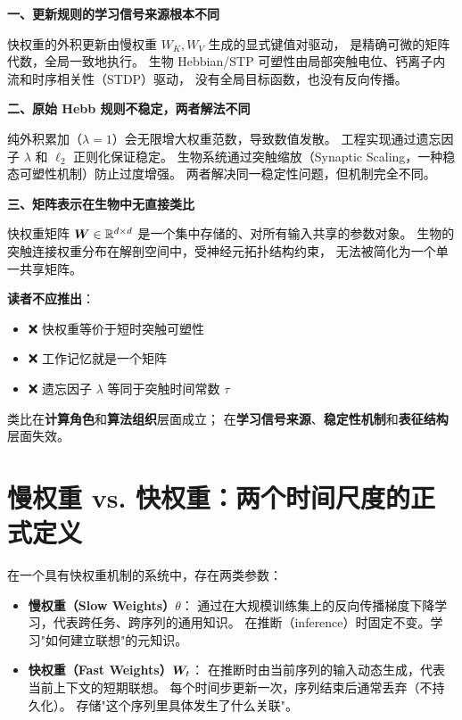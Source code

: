 \begin{analogyboundarybox}[title=这个类比在哪里失效]
\textbf{一、更新规则的学习信号来源根本不同}

快权重的外积更新由慢权重 $W_K, W_V$ 生成的显式键值对驱动，
是精确可微的矩阵代数，全局一致地执行。
生物 Hebbian/STP 可塑性由局部突触电位、钙离子内流和时序相关性（STDP）驱动，
没有全局目标函数，也没有反向传播。

\textbf{二、原始 Hebb 规则不稳定，两者解法不同}

纯外积累加（$\lambda=1$）会无限增大权重范数，导致数值发散。
工程实现通过遗忘因子 $\lambda$ 和 $\ell_2$ 正则化保证稳定。
生物系统通过突触缩放（Synaptic Scaling，一种稳态可塑性机制）防止过度增强。
两者解决同一稳定性问题，但机制完全不同。

\textbf{三、矩阵表示在生物中无直接类比}

快权重矩阵 $\boldsymbol{W} \in \mathbb{R}^{d \times d}$ 是一个集中存储的、对所有输入共享的参数对象。
生物的突触连接权重分布在解剖空间中，受神经元拓扑结构约束，
无法被简化为一个单一共享矩阵。

\textbf{读者不应推出}：
\begin{itemize}
  \item ❌ 快权重等价于短时突触可塑性
  \item ❌ 工作记忆就是一个矩阵
  \item ❌ 遗忘因子 $\lambda$ 等同于突触时间常数 $\tau$
\end{itemize}

类比在\textbf{计算角色}和\textbf{算法组织}层面成立；
在\textbf{学习信号来源}、\textbf{稳定性机制}和\textbf{表征结构}层面失效。
\end{analogyboundarybox}

\section{慢权重 vs. 快权重：两个时间尺度的正式定义}
\label{sec:slowfast}

\begin{definition}[慢权重与快权重]
\label{def:slowfast}
在一个具有快权重机制的系统中，存在两类参数：

\begin{itemize}
  \item \textbf{慢权重（Slow Weights）$\theta$}：
    通过在大规模训练集上的反向传播梯度下降学习，代表跨任务、跨序列的通用知识。
    在推断（inference）时固定不变。学习"如何建立联想"的元知识。

  \item \textbf{快权重（Fast Weights）$\boldsymbol{W}_t$}：
    在推断时由当前序列的输入动态生成，代表当前上下文的短期联想。
    每个时间步更新一次，序列结束后通常丢弃（不持久化）。
    存储"这个序列里具体发生了什么关联"。
\end{itemize}
\end{definition}

